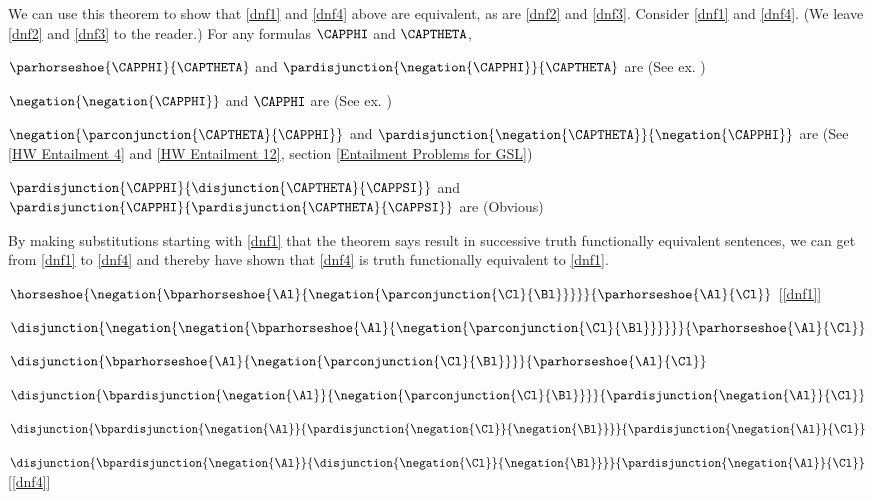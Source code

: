 \begin{majorILnc}{}
We can use this theorem to show that \ref{dnf1} and \ref{dnf4} above are equivalent, as are \ref{dnf2} and \ref{dnf3}. 
Consider \ref{dnf1} and \ref{dnf4}. 
(We leave \ref{dnf2} and \ref{dnf3} to the reader.)
For any formulas $\CAPPHI$ and $\CAPTHETA$, 
\begin{menumerate}
\item $\parhorseshoe{\CAPPHI}{\CAPTHETA}$ and $\pardisjunction{\negation{\CAPPHI}}{\CAPTHETA}$ are  (See ex. )
\item $\negation{\negation{\CAPPHI}}$ and $\CAPPHI$ are  (See ex. )
\item $\negation{\parconjunction{\CAPTHETA}{\CAPPHI}}$ and $\pardisjunction{\negation{\CAPTHETA}}{\negation{\CAPPHI}}$ are  (See \ref{HW Entailment 4} and \ref{HW Entailment 12}, section \ref{Entailment Problems for GSL})
\item $\pardisjunction{\CAPPHI}{\disjunction{\CAPTHETA}{\CAPPSI}}$ and $\pardisjunction{\CAPPHI}{\pardisjunction{\CAPTHETA}{\CAPPSI}}$ are  (Obvious)
\end{menumerate}
By making substitutions starting with \ref{dnf1} that the theorem says result in successive truth functionally equivalent sentences, we can get from \ref{dnf1} to \ref{dnf4} and thereby have shown that \ref{dnf4} is truth functionally equivalent to \ref{dnf1}.
\begin{menumerate}
\item $\horseshoe{\negation{\bparhorseshoe{\Al}{\negation{\parconjunction{\Cl}{\Bl}}}}}{\parhorseshoe{\Al}{\Cl}}$ [\ref{dnf1}]
\item $\disjunction{\negation{\negation{\bparhorseshoe{\Al}{\negation{\parconjunction{\Cl}{\Bl}}}}}}{\parhorseshoe{\Al}{\Cl}}$
\item $\disjunction{\bparhorseshoe{\Al}{\negation{\parconjunction{\Cl}{\Bl}}}}{\parhorseshoe{\Al}{\Cl}}$
\item $\disjunction{\bpardisjunction{\negation{\Al}}{\negation{\parconjunction{\Cl}{\Bl}}}}{\pardisjunction{\negation{\Al}}{\Cl}}$
\item $\disjunction{\bpardisjunction{\negation{\Al}}{\pardisjunction{\negation{\Cl}}{\negation{\Bl}}}}{\pardisjunction{\negation{\Al}}{\Cl}}$
\item $\disjunction{\bpardisjunction{\negation{\Al}}{\disjunction{\negation{\Cl}}{\negation{\Bl}}}}{\pardisjunction{\negation{\Al}}{\Cl}}$ [\ref{dnf4}]
\end{menumerate}
\end{majorILnc}

